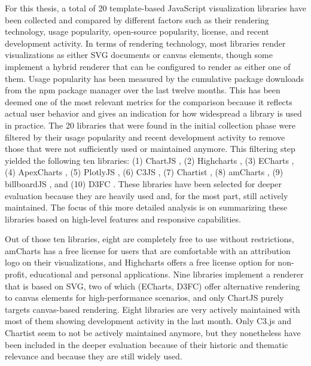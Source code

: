 For this thesis, a total of 20 template-based JavaScript visualization libraries have been collected and compared by different factors such as their rendering technology, usage popularity, open-source popularity, license, and recent development activity. In terms of rendering technology, most libraries render visualizations as either SVG documents or canvas elements, though some implement a hybrid renderer that can be configured to render as either one of them. Usage popularity has been measured by the cumulative package downloads from the npm package manager over the last twelve months. This has been deemed one of the most relevant metrics for the comparison because it reflects actual user behavior and gives an indication for how widespread a library is used in practice. The 20 libraries that were found in the initial collection phase were filtered by their usage popularity and recent development activity to remove those that were not sufficiently used or maintained anymore. This filtering step yielded the following ten libraries: (1) ChartJS \parencite{ChartJS}, (2) Highcharts \parencite{Highcharts}, (3) ECharts \parencite{ECharts}, (4) ApexCharts \parencite{ApexCharts}, (5) PlotlyJS \parencite{PlotlyJS}, (6) C3JS \parencite{C3JS}, (7) Chartist \parencite{Chartist}, (8) amCharts \parencite{amCharts}, (9) billboardJS \parencite{billboardJS}, and (10) D3FC \parencite{D3FC}. These libraries have been selected for deeper evaluation because they are heavily used and, for the most part, still actively maintained. The focus of this more detailed analysis is on summarizing these libraries based on high-level features and responsive capabilities.

Out of those ten libraries, eight are completely free to use without restrictions, amCharts has a free license for users that are comfortable with an attribution logo on their visualizations, and Highcharts offers a free license option for non-profit, educational and personal applications. Nine libraries implement a renderer that is based on SVG, two of which (ECharts, D3FC) offer alternative rendering to canvas elements for high-performance scenarios, and only ChartJS purely targets canvas-based rendering. Eight libraries are very actively maintained with most of them showing development activity in the last month. Only C3.js and Chartist seem to not be actively maintained anymore, but they nonetheless have been included in the deeper evaluation because of their historic and thematic relevance and because they are still widely used. 

